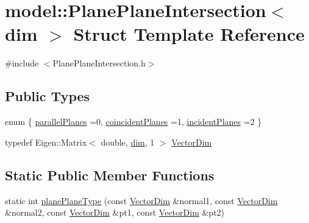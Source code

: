 \hypertarget{structmodel_1_1_plane_plane_intersection}{}\section{model\+:\+:Plane\+Plane\+Intersection$<$ dim $>$ Struct Template Reference}
\label{structmodel_1_1_plane_plane_intersection}


{\ttfamily \#include $<$Plane\+Plane\+Intersection.\+h$>$}

\subsection*{Public Types}
\begin{DoxyCompactItemize}
\item 
enum \{ \hyperlink{structmodel_1_1_plane_plane_intersection_ad460fe2232ffb336e86490b1b975fc98a6dc970ca7259d06e5d2854d919f362ca}{parallel\+Planes} =0, 
\hyperlink{structmodel_1_1_plane_plane_intersection_ad460fe2232ffb336e86490b1b975fc98a1e912a51468a153f7c4e60d59ac79fcb}{coincident\+Planes} =1, 
\hyperlink{structmodel_1_1_plane_plane_intersection_ad460fe2232ffb336e86490b1b975fc98ab47ac8f15597c3abc53f05375ed5e91d}{incident\+Planes} =2
 \}
\item 
typedef Eigen\+::\+Matrix$<$ double, \hyperlink{plot_nd_a_8m_a382f3ca768b275b8d563604f7fc7df73}{dim}, 1 $>$ \hyperlink{structmodel_1_1_plane_plane_intersection_a50f4a9f3182b0c739c129bddd9329118}{Vector\+Dim}
\end{DoxyCompactItemize}
\subsection*{Static Public Member Functions}
\begin{DoxyCompactItemize}
\item 
static int \hyperlink{structmodel_1_1_plane_plane_intersection_a45db2ac52afce763ee68252b0debb254}{plane\+Plane\+Type} (const \hyperlink{structmodel_1_1_plane_plane_intersection_a50f4a9f3182b0c739c129bddd9329118}{Vector\+Dim} \&normal1, const \hyperlink{structmodel_1_1_plane_plane_intersection_a50f4a9f3182b0c739c129bddd9329118}{Vector\+Dim} \&normal2, const \hyperlink{structmodel_1_1_plane_plane_intersection_a50f4a9f3182b0c739c129bddd9329118}{Vector\+Dim} \&pt1, const \hyperlink{structmodel_1_1_plane_plane_intersection_a50f4a9f3182b0c739c129bddd9329118}{Vector\+Dim} \&pt2)
\end{DoxyCompactItemize}



